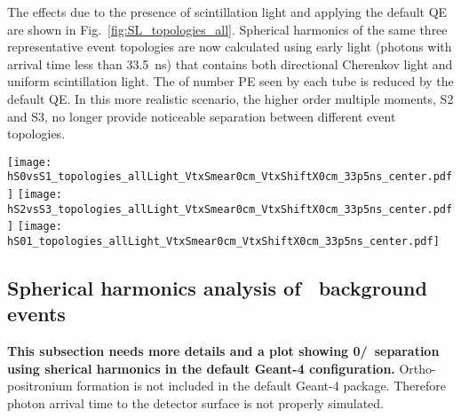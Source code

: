 The effects due to the presence of scintillation light and applying the default QE are shown in Fig.~\ref{fig:SL_topologies_all}. Spherical harmonics of the same three representative event topologies are now calculated using early light (photons with arrival time less than 33.5~ns) that contains both directional Cherenkov light and uniform scintillation light. The of number PE seen by each tube is reduced by the default QE. In this more realistic scenario, the higher order multiple moments, S2 and S3, no longer provide noticeable separation between different event topologies.


\begin{figure*}[h]
  \centering
  \texttt{[image: hS0vsS1\_topologies\_allLight\_VtxSmear0cm\_VtxShiftX0cm\_33p5ns\_center.pdf]}
  \texttt{[image: hS2vsS3\_topologies\_allLight\_VtxSmear0cm\_VtxShiftX0cm\_33p5ns\_center.pdf]}
  \texttt{[image: hS01\_topologies\_allLight\_VtxSmear0cm\_VtxShiftX0cm\_33p5ns\_center.pdf]}
  \caption{Spherical harmonics for three event topologies: two
    back-to-back 1.26~MeV electrons (\emph{black squares and black
      dotted line}), two 1.26~MeV electrons at 90$^{\circ}$ angle
    (\emph{blue triangles and blue dashed line}), and a single
    2.529~MeV electron representing $^{8}$B background (\emph{red
      crosses and red solid line}). Simulation of 1000 events
    originated at the center of the sphere. Separation between
    Cherenkov and scintillation light is implemented 33.5~ns cut on
    the photon arrival time. Perfect vertex reconstruction - true
    vertex position is used. \emph{Top left:} $S_0$ versus $S_1$
    scatter plot. Black dotted line is a linear fit of the
    90$^{\circ}$ topology and $^{8}$B events. Variable $S_{01}$ is
    defined as a projection of 2D distribution onto this linear
    fit. \emph{Top right:} $S_2$ versus $S_3$ scatter
    plot. \emph{Bottom:} $S_{01}$ distributions for the three
    topologies. These distributions are normalized to unit area for
    shape comparison}
\label{fig:SL_topologies_all}
\end{figure*}



\subsection{Spherical harmonics analysis of \C~background events}
\label{subsec:c10_spherical_harmonics}
\textbf{This subsection needs more details and a plot showing 0\nbb/\C~separation using sherical harmonics in the default Geant-4 configuration.}
Ortho-positronium formation is not included in the default Geant-4 package. Therefore photon arrival time to the detector surface is not 
properly simulated.

